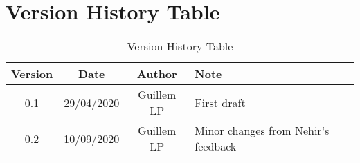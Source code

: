 \section{Version History Table}

\begin{table}[h]
	\centering
	\begin{tabular}{|c|c|c|l|}
		\hline
		Version & Date       & Author     & Note                                \\ \hline
		0.1     & 29/04/2020 & Guillem LP & First draft                         \\ \hline
		0.2     & 10/09/2020 & Guillem LP & Minor changes from Nehir's feedback \\ \hline
	\end{tabular}
	\caption{Version History Table}
	\label{tab:version-table}
\end{table}